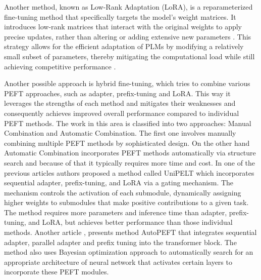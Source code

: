 \documentclass[fleqn,moreauthors,10pt]{ds_report}
\begin{document}
Another method, known as Low-Rank Adaptation (LoRA), is a reparameterized fine-tuning method that specifically targets the model's weight matrices. It introduces low-rank matrices that interact with the original weights to apply precise updates, rather than altering or adding extensive new parameters \cite{hu_lora_2021}. This strategy allows for the efficient adaptation of PLMs by modifying a relatively small subset of parameters, thereby mitigating the computational load while still achieving competitive performance \cite{zeng_expressive_2024, dinh_lift_2022}.

Another possible approach is hybrid fine-tuning, which tries to combine various PEFT approaches, such as adapter, prefix-tuning and LoRA. This way it leverages the strengths of each method and mitigates their weaknesses and consequently achieves improved overall performance compared to individual PEFT methods. The work in this area is classified into two approaches: Manual Combination and Automatic Combination. The first one involves manually combining multiple PEFT methods by sophisticated design. On the other hand Automatic Combination incorporates PEFT methods automatically via structure search and because of that it typically requires more time and cost. 
In one of the previous articles \cite{mao2021unipelt} authors proposed a method called UniPELT which incorporates sequential adapter, prefix-tuning, and LoRA via a gating mechanism. The mechanism controls the activation of each submodule, dynamically assigning higher weights to submodules that make positive contributions to a given task. The method requires more parameters and inference time than adapter, prefix-tuning, and LoRA, but achieves better performance than those individual methods. Another article \cite{zhou2023autopeft}, presents method AutoPEFT that integrates sequential adapter, parallel adapter and prefix tuning into the transformer block. The method also uses Bayesian optimization approach to automatically search for an appropriate architecture of neural network that activates certain layers to incorporate these PEFT modules.

	
\end{document}
